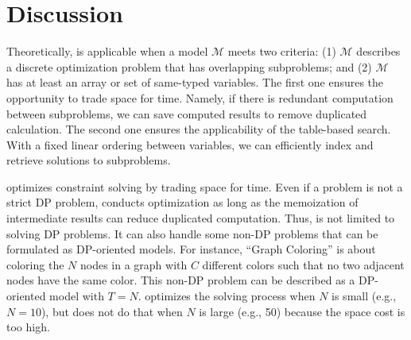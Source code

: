 \section{Discussion}

Theoretically, \tool is applicable when a model $\mathcal{M}$ meets two criteria:
(1) $\mathcal{M}$ describes a discrete optimization problem that has overlapping subproblems; and
(2) $\mathcal{M}$ has at least an array or set of same-typed variables.
The first one ensures the opportunity to trade space for time. Namely, if there is redundant computation between subproblems, we can save computed results to remove duplicated calculation.
The second one ensures the applicability of the table-based search. With a fixed linear ordering between variables, we can efficiently index and retrieve solutions to subproblems.

\tool optimizes constraint solving by trading space for time. Even if a problem is not a strict DP problem, 
\tool conducts optimization as long as the memoization of intermediate results can reduce duplicated computation. 
Thus, \tool is not limited to solving DP problems. It can also handle some non-DP problems that can be formulated as DP-oriented models. 
For instance, ``Graph Coloring'' is about coloring the $N$ nodes in a graph with $C$ different colors such that no two adjacent nodes have the same color. 
This non-DP problem can be described as a DP-oriented model with $T=N$. \tool optimizes the solving process when $N$ is small (e.g., $N=10$), but does not do that when $N$ is large (e.g., 50) because the space cost is too high. 





